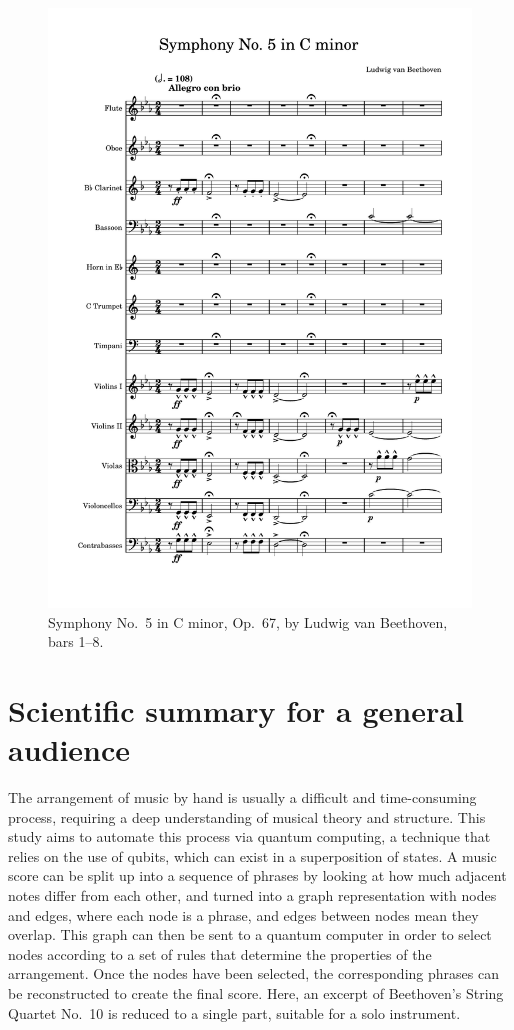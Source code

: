 \documentclass[12pt]{article}
\theoremstyle{definition}
\begin{document}
\begin{figure}
    \includegraphics[width=\textwidth,page=1]{beethoven-op67.pdf}
    \caption{Symphony No.\ 5 in C minor, Op.\ 67, by Ludwig van Beethoven, bars 1--8.}
\end{figure}

\clearpage

\section*{Scientific summary for a general audience} %

The arrangement of music by hand is usually a difficult and time-consuming process, requiring a deep understanding of musical theory and structure. This study aims to automate this process via quantum computing, a technique that relies on the use of qubits, which can exist in a superposition of states. A music score can be split up into a sequence of phrases by looking at how much adjacent notes differ from each other, and turned into a graph representation with nodes and edges, where each node is a phrase, and edges between nodes mean they overlap. This graph can then be sent to a quantum computer in order to select nodes according to a set of rules that determine the properties of the arrangement. Once the nodes have been selected, the corresponding phrases can be reconstructed to create the final score. Here, an excerpt of Beethoven's String Quartet No.\ 10 is reduced to a single part, suitable for a solo instrument.
\end{document}
